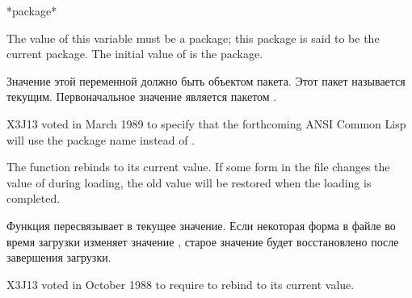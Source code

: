 \begin{defun}[Variable]
*package*

The value of this variable must be a package; this package is said to be
the current package.  The initial value of  is the 
package.

Значение этой переменной должно быть объектом пакета. Этот пакет называется
текущим. Первоначальное значение  является пакетом .
\begin{newer}
X3J13 voted in March 1989  to specify that
the forthcoming ANSI Common Lisp will use the package name 
instead of .
\end{newer}

The function  rebinds  to its current value.  If
some form in the file changes the value of  during loading,
the old value will be restored when the loading is completed.

Функция  пересвязывает  в текущее значение. Если
некоторая форма в файле во время загрузки изменяет значение ,
старое значение будет восстановлено после завершения загрузки.

\begin{newer}
X3J13 voted in October 1988 
to require  to rebind  to its current value.
\end{newer}
\end{defun}

